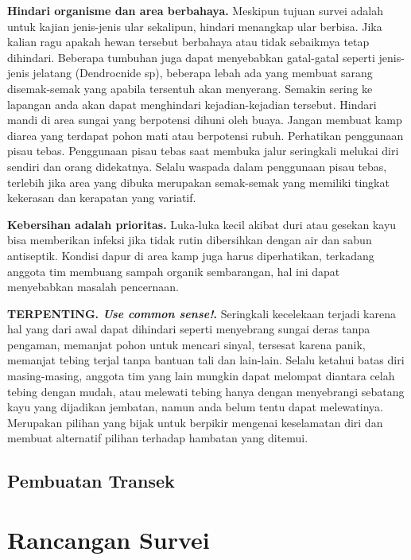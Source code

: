 \documentclass[
]{book}
\begin{document}
\textbf{Hindari organisme dan area berbahaya.} Meskipun tujuan survei adalah untuk kajian jenis-jenis ular sekalipun, hindari menangkap ular berbisa. Jika kalian ragu apakah hewan tersebut berbahaya atau tidak sebaikmya tetap dihindari. Beberapa tumbuhan juga dapat menyebabkan gatal-gatal seperti jenis-jenis jelatang (Dendrocnide sp), beberapa lebah ada yang membuat sarang disemak-semak yang apabila tersentuh akan menyerang. Semakin sering ke lapangan anda akan dapat menghindari kejadian-kejadian tersebut. Hindari mandi di area sungai yang berpotensi dihuni oleh buaya. Jangan membuat kamp diarea yang terdapat pohon mati atau berpotensi rubuh.
Perhatikan penggunaan pisau tebas. Penggunaan pisau tebas saat membuka jalur seringkali melukai diri sendiri dan orang didekatnya. Selalu waspada dalam penggunaan pisau tebas, terlebih jika area yang dibuka merupakan semak-semak yang memiliki tingkat kekerasan dan kerapatan yang variatif.

\textbf{Kebersihan adalah prioritas.} Luka-luka kecil akibat duri atau gesekan kayu bisa memberikan infeksi jika tidak rutin dibersihkan dengan air dan sabun antiseptik. Kondisi dapur di area kamp juga harus diperhatikan, terkadang anggota tim membuang sampah organik sembarangan, hal ini dapat menyebabkan masalah pencernaan.

\textbf{TERPENTING. \emph{Use common sense!}.} Seringkali kecelekaan terjadi karena hal yang dari awal dapat dihindari seperti menyebrang sungai deras tanpa pengaman, memanjat pohon untuk mencari sinyal, tersesat karena panik, memanjat tebing terjal tanpa bantuan tali dan lain-lain. Selalu ketahui batas diri masing-masing, anggota tim yang lain mungkin dapat melompat diantara celah tebing dengan mudah, atau melewati tebing hanya dengan menyebrangi sebatang kayu yang dijadikan jembatan, namun anda belum tentu dapat melewatinya. Merupakan pilihan yang bijak untuk berpikir mengenai keselamatan diri dan membuat alternatif pilihan terhadap hambatan yang ditemui.

\hypertarget{pembuatan-transek}{%
\section*{Pembuatan Transek}\label{pembuatan-transek}}

\hypertarget{rancangan-survei}{%
\chapter*{Rancangan Survei}\label{rancangan-survei}}
\end{document}
